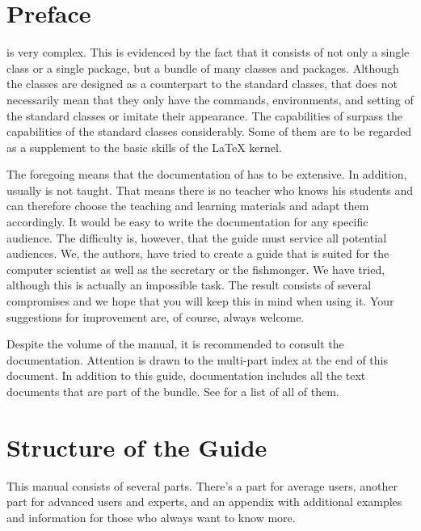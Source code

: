 \section{Preface}

\KOMAScript{} is very complex. This is evidenced by the fact that it
consists of
not only a single class or a single package, but a bundle of many classes and
packages. Although the classes are designed as a counterpart to the standard
classes, that does not necessarily mean that they only have the commands,
environments, and setting of the standard classes or imitate their
appearance. The capabilities of \KOMAScript{} surpass the capabilities of the
standard classes considerably. Some of them are to be regarded as a supplement
to the basic skills of the \LaTeX{} kernel.

The foregoing means that the documentation of \KOMAScript{} has to be
extensive. In addition, \KOMAScript{} usually is not taught. That means there
is no teacher who knows his students and can therefore choose the teaching and
learning materials and adapt them accordingly. It would be easy to write the
documentation for any specific audience. The difficulty is, however, that the
guide must service all potential audiences. We, the authors, have tried to
create a guide that is suited for the computer scientist as well as the
secretary or the fishmonger. We have tried, although this is actually %
an impossible task. The result consists of several compromises and we
hope that you will keep this in mind when using it.  Your suggestions for
improvement are, of course, always welcome.

Despite the volume of the manual, %
it is recommended to
consult the documentation. Attention is drawn to the multi-part index at the
end of this document. In addition to this guide, documentation includes all the
text documents that are part of the bundle. See  for a list
of all of them.


\section{Structure of the Guide}

This manual consists of several parts. There's a part for average users,
another part for advanced users and experts, and an appendix with additional
examples and information for those who always want to know more.

